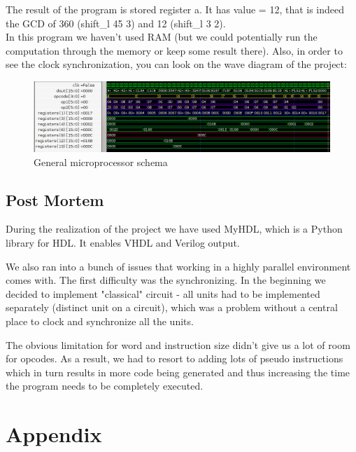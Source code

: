 \documentclass[12pt,a4paper]{scrartcl}
\begin{document}
The result of the program is stored register a. It has value = 12, that is indeed the GCD of 360 (shift\_l 45 3) and 12 (shift\_l 3 2).\\
In this program we haven't used RAM (but we could potentially run the computation through the memory or keep some result there).
Also, in order to see the clock synchronization, you can look on the wave diagram of the project:

\begin{figure}[h]
	\includegraphics[scale=0.7,center]{pics/gtkwave.png}
	\caption{General microprocessor schema}
\end{figure}

\newpage
\subsection{Post Mortem}
During the realization of the project we have used MyHDL, which is a Python library for HDL. It enables VHDL and Verilog output.

We also ran into a bunch of issues that working in a highly parallel environment comes with.
The first difficulty was the synchronizing. In the beginning we decided to implement "classical" circuit - all units had to be implemented separately (distinct unit on a circuit), which was a problem without a central place to clock and synchronize all the units.

The obvious limitation for word and instruction size didn't give us a lot of room for opcodes. As a result, we had to resort to adding lots of pseudo instructions which in turn results in more code being generated and thus increasing the time the program needs to be completely executed. 

\newpage
\section{Appendix}
\end{document}
